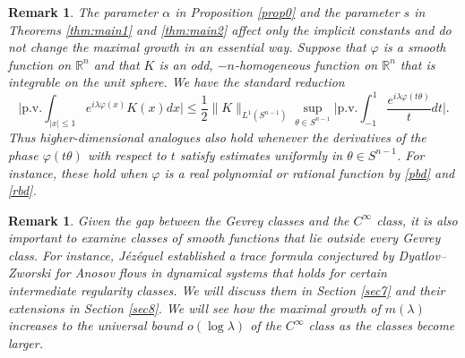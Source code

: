 \documentclass[11pt]{amsart}
\newtheorem{remark}[theorem]{Remark}
\newcommand{\la}{\lambda}
\newcommand{\R}{\mathbb{R}}
\newcommand{\1}{{\rm 1\hspace*{-0.4ex}%
			\rule{0.1ex}{1.52ex}\hspace*{0.2ex}}}
\numberwithin{equation}{section}
\begin{document}
\begin{remark}\label{rm1}{\rm The parameter $\alpha$ in Proposition \ref{prop0} and the parameter $s$ in Theorems \ref{thm:main1} and \ref{thm:main2} affect only the implicit constants and do not change the maximal growth in an essential way. Suppose that $\varphi$ is a smooth function on $\R^n$ and that $K$ is an odd, $-n$-homogeneous function on $\R^n$ that is integrable on the unit sphere. We have the standard reduction
	\begin{equation}
		\Big|\mathrm{p.v.}\int_{|x|\le 1}e^{i\la\varphi(x)}K(x)dx\Big|\le \frac12\|K\|_{L^1(S^{n-1})}\sup_{\theta\in S^{n-1}}\Big|\mathrm{p.v.}\int_{-1}^1\frac{e^{i\la\varphi(t\theta )}}tdt\Big|.
	\end{equation}
	Thus higher-dimensional analogues also hold whenever the derivatives of the phase $\varphi(t\theta)$ with respect to $t$ satisfy estimates uniformly in $\theta\in S^{n-1}$. For instance, these hold when $\varphi$ is a real polynomial or rational function by  \eqref{pbd} and \eqref{rbd}. }
\end{remark}

\begin{remark}\label{rm2}{\rm
	Given the gap between the Gevrey classes and the $C^\infty$ class, it is also important to examine classes of smooth functions that lie outside every Gevrey class. For instance, Jézéquel \cite{jez} established a trace formula conjectured by Dyatlov--Zworski \cite{dz2016} for Anosov flows in dynamical systems that holds for certain intermediate regularity classes. We will discuss them in Section \ref{sec7} and their extensions in Section \ref{sec8}. We will see how the maximal growth of $m(\la)$ increases to the universal bound $o(\log\la)$ of the $C^\infty$ class as the classes become larger.
	}
\end{remark}
\end{document}
